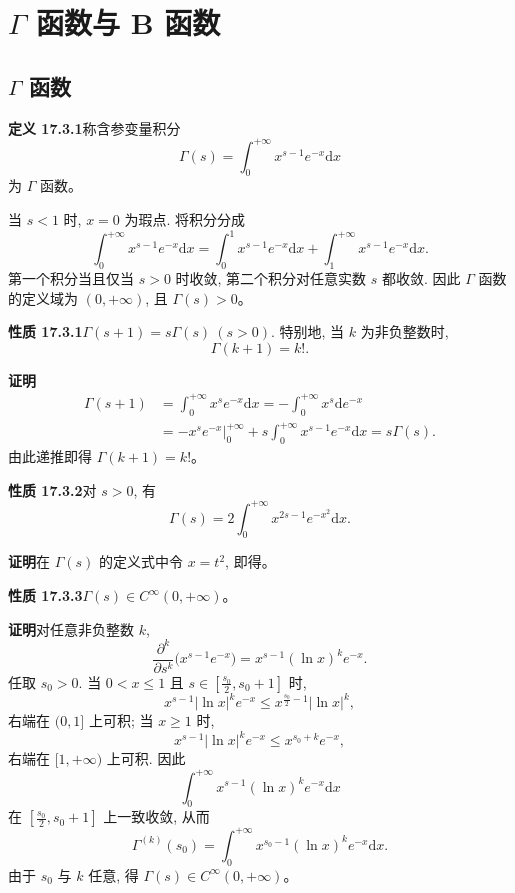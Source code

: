 \documentclass[UTF8, 12pt, fontset=fandol, oneside]{ctexart}
\begin{document}
\section{$\Gamma$ 函数与 B 函数}

\subsection{$\Gamma$ 函数}

\noindent\textbf{定义 17.3.1}\quad 称含参变量积分
\[
  \Gamma(s)=\int_0^{+\infty}x^{s-1}e^{-x}\mathrm dx
\]
为 $\Gamma$ 函数。

当 $s<1$ 时, $x=0$ 为瑕点. 将积分分成
\[
  \int_0^{+\infty}x^{s-1}e^{-x}\mathrm dx
  =
  \int_0^1x^{s-1}e^{-x}\mathrm dx+\int_1^{+\infty}x^{s-1}e^{-x}\mathrm dx.
\]
第一个积分当且仅当 $s>0$ 时收敛, 第二个积分对任意实数 $s$ 都收敛. 因此 $\Gamma$ 函数的定义域为 $(0,+\infty)$, 且 $\Gamma(s)>0$。

\noindent\textbf{性质 17.3.1}\quad $\Gamma(s+1)=s\Gamma(s)\ (s>0)$. 特别地, 当 $k$ 为非负整数时,
\[
  \Gamma(k+1)=k!.
\]

\noindent\textbf{证明}\quad
\[
\begin{aligned}
  \Gamma(s+1)
  &=\int_0^{+\infty}x^s e^{-x}\mathrm dx
  =-\int_0^{+\infty}x^s\mathrm d e^{-x}\\
  &=-x^s e^{-x}\Big|_0^{+\infty}
  +s\int_0^{+\infty}x^{s-1}e^{-x}\mathrm dx
  =s\Gamma(s).
\end{aligned}
\]
由此递推即得 $\Gamma(k+1)=k!$。

\noindent\textbf{性质 17.3.2}\quad 对 $s>0$, 有
\[
  \Gamma(s)=2\int_0^{+\infty}x^{2s-1}e^{-x^2}\mathrm dx.
\]

\noindent\textbf{证明}\quad 在 $\Gamma(s)$ 的定义式中令 $x=t^2$, 即得。

\noindent\textbf{性质 17.3.3}\quad $\Gamma(s)\in C^\infty(0,+\infty)$。

\noindent\textbf{证明}\quad 对任意非负整数 $k$,
\[
  \frac{\partial^k}{\partial s^k}\bigl(x^{s-1}e^{-x}\bigr)
  =x^{s-1}(\ln x)^k e^{-x}.
\]
任取 $s_0>0$. 当 $0<x\leqslant1$ 且 $s\in[\frac{s_0}2,s_0+1]$ 时,
\[
  x^{s-1}|\ln x|^k e^{-x}\leqslant x^{\frac{s_0}2-1}|\ln x|^k,
\]
右端在 $(0,1]$ 上可积; 当 $x\geqslant1$ 时,
\[
  x^{s-1}|\ln x|^k e^{-x}\leqslant x^{s_0+k}e^{-x},
\]
右端在 $[1,+\infty)$ 上可积. 因此
\[
  \int_0^{+\infty}x^{s-1}(\ln x)^k e^{-x}\mathrm dx
\]
在 $[\frac{s_0}2,s_0+1]$ 上一致收敛, 从而
\[
  \Gamma^{(k)}(s_0)=\int_0^{+\infty}x^{s_0-1}(\ln x)^k e^{-x}\mathrm dx.
\]
由于 $s_0$ 与 $k$ 任意, 得 $\Gamma(s)\in C^\infty(0,+\infty)$。
\end{document}
